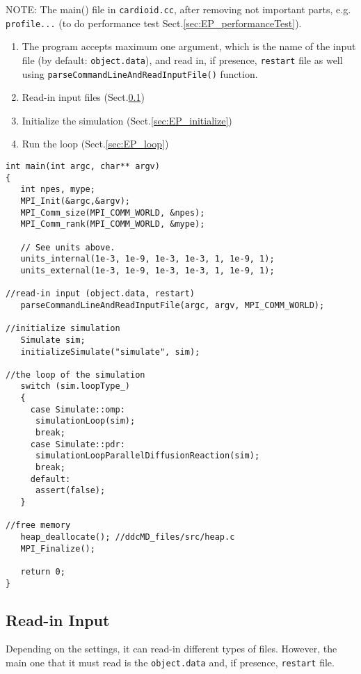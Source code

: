 NOTE: The main() file in \verb!cardioid.cc!, after removing not important parts,
e.g. \verb!profile...! (to do performance test
Sect.\ref{sec:EP_performanceTest}).
\begin{enumerate}
  \item The program accepts maximum one argument, which is the name of the input
  file (by default: \verb!object.data!), and read in, if presence,
  \verb!restart! file as well using \verb!parseCommandLineAndReadInputFile()!
  function. 
  \item Read-in input files (Sect.\ref{sec:EP_input})
  \item Initialize the simulation (Sect.\ref{sec:EP_initialize})
  \item Run the loop (Sect.\ref{sec:EP_loop})
\end{enumerate}

{\small \begin{verbatim}
int main(int argc, char** argv)
{
   int npes, mype;
   MPI_Init(&argc,&argv);
   MPI_Comm_size(MPI_COMM_WORLD, &npes);
   MPI_Comm_rank(MPI_COMM_WORLD, &mype);  

   // See units above.
   units_internal(1e-3, 1e-9, 1e-3, 1e-3, 1, 1e-9, 1); 
   units_external(1e-3, 1e-9, 1e-3, 1e-3, 1, 1e-9, 1); 
   
//read-in input (object.data, restart)
   parseCommandLineAndReadInputFile(argc, argv, MPI_COMM_WORLD);
   
//initialize simulation   
   Simulate sim;
   initializeSimulate("simulate", sim);

//the loop of the simulation
   switch (sim.loopType_)
   {
     case Simulate::omp:
      simulationLoop(sim);
      break;
     case Simulate::pdr:
      simulationLoopParallelDiffusionReaction(sim);
      break;
     default:
      assert(false);
   }

//free memory
   heap_deallocate(); //ddcMD_files/src/heap.c
   MPI_Finalize();

   return 0;
}
\end{verbatim}}


\subsection{Read-in Input}
\label{sec:EP_input}

Depending on the settings, it can read-in different types of files. However, the
main one that it must read is the \verb!object.data! and, if presence,
\verb!restart! file.

